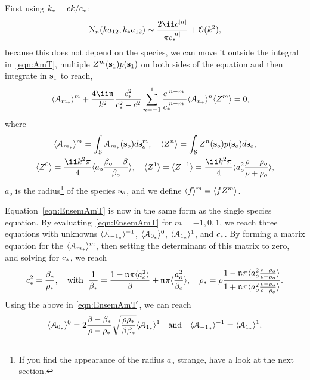 \documentclass[ 12pt, a4paper]{article}
\begin{document}
First using $k_* = c k /c_* $:
\[
 \mathcal N_{n}(ka_{12},k_\eff a_{12}) \sim \frac{2 \ii c^{|n|}}{\pi c_\eff^{|n|}} + \mathcal O(k^2),
\]
because this does not depend on the species, we can move it outside the integral in~\eqref{eqn:AmT}, multiple $Z^m(\mathbf s_1) p(\mathbf s_1)$ on both sides of the equation  and then integrate in $\mathbf s_1$ to reach,
\begin{align}
    & \ensem{\A{m_\eff}}^m  +  \frac{4 \ii \nfrac {}}{k^2} \frac{c_\eff^2}{c_\eff^2- c^2} \sum_{n=-1}^1
\frac{c^{|n-m|}}{c_\eff^{|n-m|}}
  \ensem{\A{n_\eff}}^n \ensem{Z^m}
   = 0,
   \label{eqn:EnsemAmT}
\end{align}
where
\begin{gather}
  \ensem{\A{m_\eff}}^m =  \int_\regS  \A{m_\eff}(\s_o) d\s_o^m,
  \quad \ensem{Z^n} =  \int_\regS Z^n(\s_o) p(\s_o) d\s_o, \\
  \ensem{Z^0} = \frac{\ii k^2 \pi}{4} \ensem{a_o\frac{\beta_o-\beta}{\beta_o}}, \quad \ensem{Z^1} = \ensem{Z^{-1}} = \frac{\ii k^2 \pi}{4} \ensem{a^2_o\frac{\rho - \rho_o}{\rho + \rho_o}},
\end{gather}
$a_o$ is the radius\footnote{If you find the appearance of the radius $a_o$ strange, have a look at the next section.} of the species $\mathbf s_o$, and we define $\langle f \rangle^m = \langle f Z^m \rangle$.


Equation~\eqref{eqn:EnsemAmT} is now in the same form as the single species equation. By evaluating~\eqref{eqn:EnsemAmT} for $m=-1,0,1$, we reach three equations with unknowns $\langle {\mathcal A_{{-1}_*}} \rangle^{-1}$,  $\langle \mathcal A_{{0}_*} \rangle^0$, $\langle \mathcal A_{{1}_*} \rangle^1$, and $c_*$.
By forming a matrix equation for the $\langle {\mathcal A_{m_*}} \rangle^m$, then setting the determinant of this matrix to zero, and solving for $c_*$, we reach
\begin{equation}
  c_*^2 = \frac{\beta_*}{\rho_*}, \quad \text{with} \;\;
  \frac{1}{\beta_*} = \frac{1-\mathfrak n_{} \pi \langle a_o^2 \rangle}{\beta} + \mathfrak n_{} \pi \langle \frac{a_o^2}{\beta_o} \rangle, \quad
  \rho_* = \rho \frac{1 - \mathfrak n_{} \pi \langle a_o^2\frac{\rho-\rho_o}{\rho+\rho_o} \rangle}{1 + \mathfrak n_{} \pi \langle a_o^2\frac{\rho-\rho_o}{\rho+\rho_o} \rangle}.
  \label{eqns:effective_properties}
\end{equation}
Using the above in \eqref{eqn:EnsemAmT}, we can reach
\begin{equation}
\langle \mathcal A_{{0}_*} \rangle^0 = 2\frac{\beta-\beta_*}{\rho-\rho_*}\sqrt{\frac{\rho \rho_*}{\beta \beta_*}} \langle \mathcal A_{{1}_*} \rangle^1  \quad \text{and} \quad \langle {\mathcal A_{{-1}}}_* \rangle^{-1} = \langle \mathcal A_{{1}_*} \rangle^{1}.
\label{eqn:As}
\end{equation}
\end{document}
